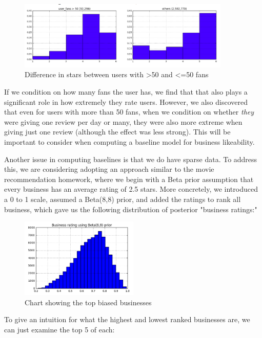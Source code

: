 \documentclass[11pt]{article}
\begin{document}
\begin{figure}[H]
\centering
\includegraphics[width=0.9\textwidth]{./ac209/lotsoffans.png}
\caption{Difference in stars between users with >50 and <=50 fans}
\end{figure}

If we condition on how many fans the user has, we find that that also plays a significant role in how extremely they rate users. However, we also discovered that even for users with more than 50 fans, when we condition on whether \textit{they} were giving one review per day or many, they were also more extreme when giving just one review (although the effect was less strong). This will be important to consider when computing a baseline model for business likeability.

\par Another issue in computing baselines is that we do have sparse data. To address this, we are considering adopting an approach similar to the movie recommendation homework, where we begin with a Beta prior assumption that every business has an average rating of 2.5 stars. More concretely, we introduced a 0 to 1 scale, assumed a Beta(8,8) prior, and added the ratings to rank all business, which gave us the following distribution of posterior "business ratings:"

\begin{figure}[H]
\centering
\includegraphics[width=0.5\textwidth]{./ac209/business-ratings-with-title.png}
\caption{Chart showing the top biased businesses}
\end{figure}

\par To give an intuition for what the highest and lowest ranked businesses are, we can just examine the top 5 of each:
\end{document}
